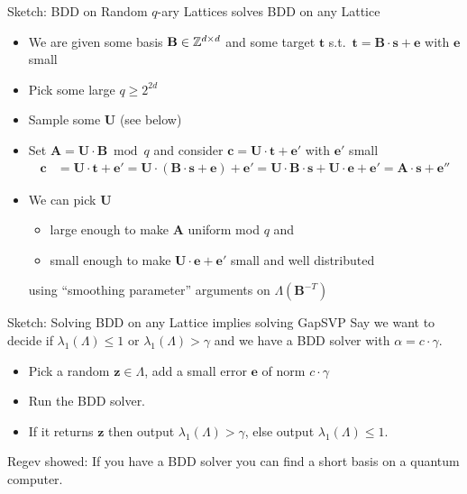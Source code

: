 \documentclass[xcolor=table,10pt,aspectratio=169]{beamer}
\renewcommand{\vec}[1]{\ensuremath{\mathbf{#1}}\xspace}
\providecommand{\mat}[1]{\ensuremath{\vec{#1}}\xspace}
\begin{document}
\begin{frame}[label={sec:org0701673}]{Sketch: BDD on Random \(q\)-ary Lattices solves BDD on any Lattice}
\begin{itemize}
\item We are given some basis \(\mat{B} \in \ZZ^{d \times d}\) and some target \(\vec{t}\) s.t. \(\vec{t} = \mat{B}\cdot \vec{s} + \vec{e}\) with \(\vec{e}\) small
\item Pick some large \(q \geq 2^{2d}\)
\item Sample some \(\mat{U}\) (see below)
\item Set \(\mat{A} = \mat{U}\cdot \mat{B} \bmod q\) and consider \(\vec{c} = \mat{U} \cdot \vec{t} + \vec{e}'\) with \({\vec{e}'}\) small
\begin{align*}
\vec{c} &= \mat{U} \cdot \vec{t} + \vec{e}' = \mat{U} \cdot \left(\mat{B}\cdot \vec{s} + \vec{e} \right) + \vec{e}' = \mat{U} \cdot \mat{B}\cdot \vec{s} + \mat{U} \cdot \vec{e} + \vec{e}' = \mat{A} \cdot \vec{s} + \vec{e}''
\end{align*}
\item We can pick \(\mat{U}\)
\begin{itemize}
\item large enough to make \(\mat{A}\) uniform mod \(q\) and
\item small enough to make \(\mat{U} \cdot \vec{e} + \vec{e}'\) small and well distributed
\end{itemize}
using ``smoothing parameter'' arguments on \(\Lambda(\mat{B}^{-T})\)
\end{itemize}

\end{frame}
\begin{frame}[label={sec:orga59761d}]{Sketch: Solving BDD on any Lattice implies solving GapSVP}
Say we want to decide if \(\lambda_{1}(\Lambda) \leq 1\) or \(\lambda_{1}(\Lambda) > \gamma\) and we have a BDD solver with \(\alpha = c\cdot \gamma\).

\begin{itemize}
\item Pick a random \(\vec{z} \in \Lambda\), add a small error \(\vec{e}\) of norm \(c\cdot \gamma\)
\item Run the BDD solver.
\item If it returns \(\vec{z}\) then output \(\lambda_{1}(\Lambda) > \gamma\), else output \(\lambda_{1}(\Lambda) \leq 1\).
\end{itemize}

Regev showed: If you have a BDD solver you can find a short basis on a quantum computer. 
\end{frame}
\end{document}
